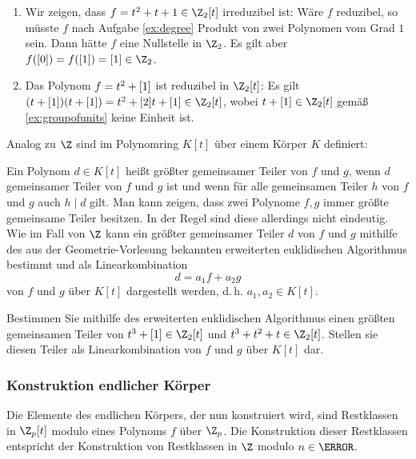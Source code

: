 \begin{example}
 \begin{enumerate}
  \item Wir zeigen, dass $f = t^2 + t + 1 \in \Z_2[t]$ irreduzibel ist: Wäre $f$ reduzibel, so müsste $f$ nach Aufgabe \ref{ex:degree} Produkt von zwei Polynomen vom Grad $1$ sein. Dann hätte $f$ eine Nullstelle in $\Z_2$. Es gilt aber $f(\ol 0) = f(\ol 1) = \ol 1 \in \Z_2$. 
  \item Das Polynom $f = t^2 + [1]$ ist reduzibel in $\Z_2[t]$: Es gilt $(t + \ol 1)(t+ \ol 1) = t^2 + \ol 2t + \ol 1 \in \Z_2[t]$, wobei $t + \ol 1 \in \Z_2[t]$ gemäß \ref{ex:groupofunits} keine Einheit ist.
 \end{enumerate}
\end{example}

\begin{remark}\label{rem:ggT}
 Analog zu $\Z$ sind im Polynomring $K[t]$ über einem Körper $K$  definiert: 
 
 Ein Polynom $d \in K[t]$ heißt größter gemeinsamer Teiler von $f$ und $g$, wenn $d$ gemeinsamer Teiler von $f$ und $g$ ist und wenn für alle gemeinsamen Teiler $h$ von $f$ und $g$ auch $h \mid d$ gilt. Man kann zeigen, dass zwei Polynome  $f, g$ immer größte gemeinsame Teiler besitzen. In der Regel sind diese allerdings nicht eindeutig. Wie im Fall von $\Z$ kann ein größter gemeinsamer Teiler $d$ von $f$ und $g$ mithilfe des aus der Geometrie-Vorlesung bekannten erweiterten euklidischen Algorithmus bestimmt und als Linearkombination 
 \[d = a_1f + a_2g\]
 von $f$ und $g$ über $K[t]$ dargestellt werden, d.\,h. $a_1, a_2 \in K[t]$. 
\end{remark}

\begin{exercise}
 Bestimmen Sie mithilfe des erweiterten euklidischen Algorithmus einen größten gemeinsamen Teiler von $t^3 + \ol 1 \in \Z_2[t]$ und $t^3 + t^2 + t \in \Z_2[t]$. Stellen sie diesen Teiler als Linearkombination von $f$ und $g$ über $K[t]$ dar.
\end{exercise}

\subsubsection{Konstruktion endlicher Körper}

Die Elemente des endlichen Körpers, der nun konstruiert wird, sind Restklassen in $\Z_p[t]$ modulo eines Polynoms $f$ über $\Z_p$. Die Konstruktion dieser Restklassen entspricht der Konstruktion von Restklassen in $\Z$ modulo $n \in \N$.

